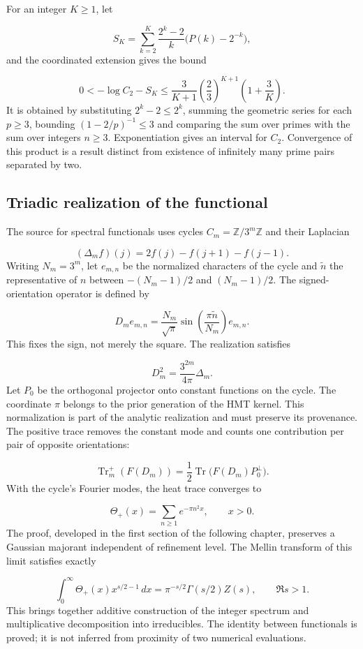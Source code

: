 For an integer \(K\ge1\), let

\[
S_K=\sum_{k=2}^K\frac{2^k-2}{k}\bigl(P(k)-2^{-k}\bigr),
\]
and the coordinated extension gives the bound

\[
0<-\log C_2-S_K
\le\frac3{K+1}\left(\frac23\right)^{K+1}\left(1+\frac3K\right).
\]
It is obtained by substituting $2^k-2\le2^k$, summing the geometric series for each $p\ge3$, bounding $(1-2/p)^{-1}\le3$ and comparing the sum over primes with the sum over integers $n\ge3$. Exponentiation gives an interval for $C_2$. Convergence of this product is a result distinct from existence of infinitely many prime pairs separated by two.



\subsection{Triadic realization of the functional}
The source for spectral functionals uses cycles $C_m=\mathbb Z/3^m\mathbb Z$ and their Laplacian

\[
(\Delta_mf)(j)=2f(j)-f(j+1)-f(j-1).
\]
Writing \(N_m=3^m\), let \(e_{m,n}\) be the normalized characters of the cycle and \(\widetilde n\) the representative of \(n\) between \(-(N_m-1)/2\) and \((N_m-1)/2\). The signed-orientation operator is defined by

\[
D_m e_{m,n}=\frac{N_m}{\sqrt{\pi}}
\sin\left(\frac{\pi\widetilde n}{N_m}\right)e_{m,n}.
\]
This fixes the sign, not merely the square. The realization satisfies

\[
D_m^2=\frac{3^{2m}}{4\pi}\Delta_m.
\]
Let \(P_0\) be the orthogonal projector onto constant functions on the cycle. The coordinate $\pi$ belongs to the prior generation of the HMT kernel. This normalization is part of the analytic realization and must preserve its provenance. The positive trace removes the constant mode and counts one contribution per pair of opposite orientations:

\[
\operatorname{Tr}_m^+(F(D_m))
=\frac12\operatorname{Tr}\bigl(F(D_m)P_0^\perp\bigr).
\]
With the cycle's Fourier modes, the heat trace converges to

\[
\Theta_+(x)=\sum_{n\ge1}e^{-\pi n^2x},\qquad x>0.
\]
The proof, developed in the first section of the following chapter, preserves a Gaussian majorant independent of refinement level. The Mellin transform of this limit satisfies exactly

\[
\int_0^\infty\Theta_+(x)x^{s/2-1}\,dx
=\pi^{-s/2}\Gamma(s/2)Z(s),\qquad \Re s>1.
\]
This brings together additive construction of the integer spectrum and multiplicative decomposition into irreducibles. The identity between functionals is proved; it is not inferred from proximity of two numerical evaluations.

